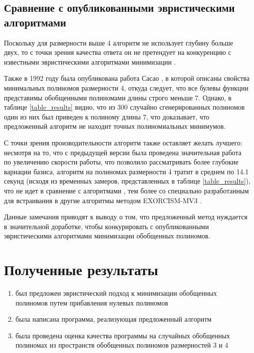 \documentclass[a4paper,12pt,titlepage]{article}
\begin{document}
\subsection{Сравнение с опубликованными эвристическими алгоритмами}

Поскольку для размерности выше 4 алгоритм не использует глубину больше двух, то с точки зрения качества ответа он не претендует на конкуренцию с известными эвристическими алгоритмами минимизации \cite{exmin2, exorcism4, exorcism-mv3, grmin2}.

Также в 1992 году была опубликована работа Сасао \cite{4var-min}, в которой описаны свойства минимальных полиномов размерности 4, откуда следует, что все булевы функции представимы обобщенными полиномами длины строго меньше 7. Однако, в таблице \ref{table_results} видно, что из 300 случайно сгенерированных полиномов один из них был приведен к полиному длины 7, что доказывает, что предложенный алгоритм не находит точных полиномиальных минимумов.

С точки зрения производительности алгоритм также оставляет желать лучшего: несмотря на то, что с предыдущей версии была проведена значительная работа по увеличению скорости работы, что позволило рассматривать более глубокие вариации базиса, алгоритм на полиномах размерности 4 тратит в среднем по 14.1 секунд (исходя из временных замеров, представленных в таблице \ref{table_results}), что не идет в сравнение с алгоритмами \cite{exmin2, exorcism4, grmin2}, тем более со специально разработанным для встраивания в другие алгоритмы методом \textsc{EXORCISM-MV3} \cite{exorcism-mv3}.

Данные замечания приводят к выводу о том, что предложенный метод нуждается в значительной доработке, чтобы конкурировать с опубликованными эвристическими алгоритмами минимизации обобщенных полиномов.

\section{Полученные результаты}

\begin{enumerate}
    \item был предложен эвристический подход к минимизации обобщенных полиномов путем прибавления нулевых полиномов
    \item была написана программа, реализующая предложенный алгоритм
    \item была проведена оценка качества программы на случайных обобщенных полиномах из пространств обобщенных полиномов размерностей 3 и 4
\end{enumerate}
\end{document}
